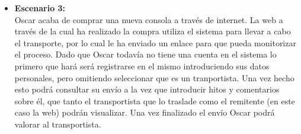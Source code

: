 \documentclass[10pt, a4paper,spanish]{article}
\begin{document}
\begin{itemize}
			\item \textbf{Escenario 3:} \\
				Oscar acaba de comprar una nueva consola a través de internet. La web a través de la cual ha realizado la compra utiliza el sistema para llevar a cabo el transporte, por lo cual le ha enviado un enlace para que pueda monitorizar el proceso. Dado que Oscar todavía no tiene una cuenta en el sistema lo primero que hará será registrarse en el mismo introduciendo sus datos personales, pero omitiendo seleccionar que es un tranportista. Una vez hecho esto podrá consultar su envío a la vez que introducir hitos y comentarios sobre él, que tanto el transportista que lo traslade como el remitente (en este caso la web) podrán visualizar. Una vez finalizado el envío Oscar podrá valorar al transportista.

		\end{itemize}
\end{document}
